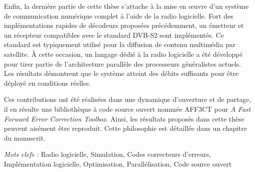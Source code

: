 Enfin, la dernière partie de cette thèse s'attache à la mise en œuvre d'un
système de communication numérique complet à l'aide de la radio logicielle. Fort
des implémentations rapides de décodeurs proposées précédemment, un émetteur et
un récepteur compatibles avec le standard DVB-S2 sont implémentés. Ce standard
est typiquement utilisé pour la diffusion de contenu multimédia par satellite. À
cette occasion, un langage dédié à la radio logicielle a été développé pour
tirer partie de l'architecture parallèle des processeurs généralistes actuels.
Les résultats démontrent que le système atteint des débits suffisants pour être
déployé en conditions réelles.

Ces contributions ont été réalisées dans une dynamique d'ouverture et de
partage, il en résulte une bibliothèque à code source ouvert nommée AFF3CT pour
\emph{A Fast Forward Error Correction Toolbox}. Ainsi, les résultats proposés
dans cette thèse peuvent aisément être reproduit. Cette philosophie est
détaillée dans un chapitre du manuscrit.

\vskip0.5cm
\emph{Mots clefs :} Radio logicielle, Simulation, Codes correcteurs d'erreurs,
                    Implémentation logicielle, Optimisation, Parallélisation,
                    Code source ouvert
